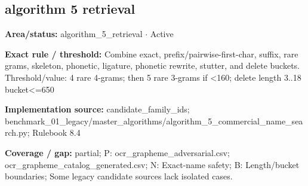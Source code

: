 \subsection*{algorithm 5 retrieval}
\begin{tcolorbox}[enhanced,breakable,colback=white,colframe=Muted!45,boxrule=0.45pt,arc=1.5pt,left=6pt,right=6pt,top=5pt,bottom=5pt,title={\texttt{A5-BASE-CANDIDATES-05}},title after break={\texttt{A5-BASE-CANDIDATES-05}\ (continued)},fonttitle=\headingfont\bfseries\color{Navy},coltitle=Navy]
\textbf{Area/status:} algorithm\_\allowbreak{}5\_\allowbreak{}retrieval $\boldsymbol{\cdot}$ Active\par
\smallskip
\textbf{Exact rule / threshold:} Combine exact, prefix/\allowbreak{}pairwise-first-char, suffix, rare grams, skeleton, phonetic, ligature, phonetic rewrite, stutter, and delete buckets. Threshold/\allowbreak{}value: 4 rare 4-grams; then 5 rare 3-grams if <160; delete length 3..18 bucket<=650\par
\smallskip
\textbf{Implementation source:} candidate\_\allowbreak{}family\_\allowbreak{}ids; benchmark\_\allowbreak{}01\_\allowbreak{}legacy/\allowbreak{}master\_\allowbreak{}algorithms/\allowbreak{}algorithm\_\allowbreak{}5\_\allowbreak{}commercial\_\allowbreak{}name\_\allowbreak{}search.py; Rulebook 8.4\par
\smallskip
\textbf{Coverage / gap:} partial; P: ocr\_\allowbreak{}grapheme\_\allowbreak{}adversarial.csv; ocr\_\allowbreak{}grapheme\_\allowbreak{}catalog\_\allowbreak{}generated.csv; N: Exact-name safety; B: Length/\allowbreak{}bucket boundaries; Some legacy candidate sources lack isolated cases.
\end{tcolorbox}
\medskip
